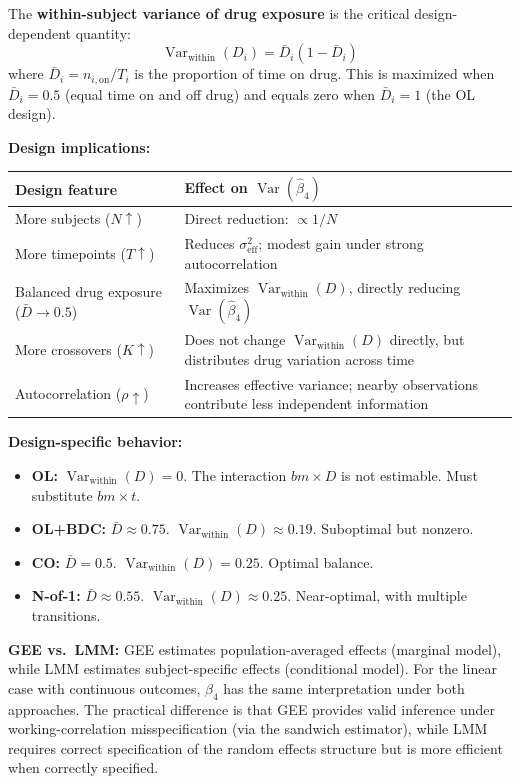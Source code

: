 \documentclass[11pt]{article}
\begin{document}
The \textbf{within-subject variance of drug exposure} is the critical
design-dependent quantity:
\[
\operatorname{Var}_{\text{within}}(D_i) = \bar{D}_i(1 - \bar{D}_i)
\]
where $\bar{D}_i = n_{i,\text{on}} / T_i$ is the proportion of time on
drug. This is maximized when $\bar{D}_i = 0.5$ (equal time on and off
drug) and equals zero when $\bar{D}_i = 1$ (the OL design).

\textbf{Design implications:}

\begin{table}[h]
\centering\small
\begin{tabular}{@{}L{5cm}L{8.5cm}@{}}
\toprule
Design feature & Effect on $\operatorname{Var}(\hat{\beta}_4)$ \\
\midrule
More subjects ($N \uparrow$) & Direct reduction: $\propto 1/N$ \\
More timepoints ($T \uparrow$) & Reduces $\sigma^2_{\text{eff}}$; modest gain under strong autocorrelation \\
Balanced drug exposure ($\bar{D} \to 0.5$) & Maximizes $\operatorname{Var}_{\text{within}}(D)$, directly reducing $\operatorname{Var}(\hat{\beta}_4)$ \\
More crossovers ($K \uparrow$) & Does not change $\operatorname{Var}_{\text{within}}(D)$ directly, but distributes drug variation across time \\
Autocorrelation ($\rho \uparrow$) & Increases effective variance; nearby observations contribute less independent information \\
\bottomrule
\end{tabular}
\end{table}

\textbf{Design-specific behavior:}
\begin{itemize}[nosep]
\item \textbf{OL:} $\operatorname{Var}_{\text{within}}(D) = 0$. The
  interaction $bm \times D$ is not estimable. Must substitute
  $bm \times t$.
\item \textbf{OL+BDC:} $\bar{D} \approx 0.75$.
  $\operatorname{Var}_{\text{within}}(D) \approx 0.19$. Suboptimal but
  nonzero.
\item \textbf{CO:} $\bar{D} = 0.5$.
  $\operatorname{Var}_{\text{within}}(D) = 0.25$. Optimal balance.
\item \textbf{N-of-1:} $\bar{D} \approx 0.55$.
  $\operatorname{Var}_{\text{within}}(D) \approx 0.25$. Near-optimal,
  with multiple transitions.
\end{itemize}

\textbf{GEE vs.\ LMM:} GEE estimates population-averaged effects
(marginal model), while LMM estimates subject-specific effects
(conditional model). For the linear case with continuous outcomes,
$\beta_4$ has the same interpretation under both approaches. The
practical difference is that GEE provides valid inference under
working-correlation misspecification (via the sandwich estimator), while
LMM requires correct specification of the random effects structure but
is more efficient when correctly specified.
\end{document}

